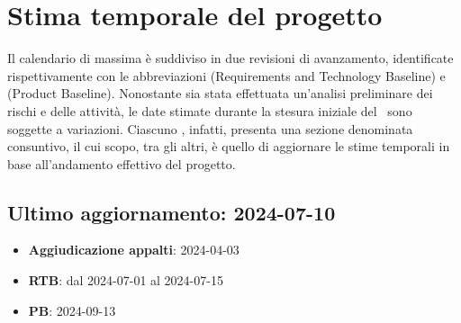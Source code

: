 \section{Stima temporale del progetto}
\label{sec:stima_temporale}

\par Il calendario di massima è suddiviso in due revisioni di avanzamento, identificate rispettivamente con le abbreviazioni  (Requirements and Technology Baseline) e  (Product Baseline). Nonostante sia stata effettuata un'analisi preliminare dei rischi e delle attività, le date stimate durante la stesura iniziale del \PdP\ sono soggette a variazioni. Ciascuno , infatti, presenta una sezione denominata consuntivo, il cui scopo, tra gli altri, è quello di aggiornare le stime temporali in base all'andamento effettivo del progetto.

\subsection{Ultimo aggiornamento: 2024-07-10}
\begin{itemize}
  \item \textbf{Aggiudicazione appalti}: 2024-04-03
  \item \textbf{RTB}: dal 2024-07-01 al 2024-07-15
  \item \textbf{PB}: 2024-09-13
\end{itemize}
